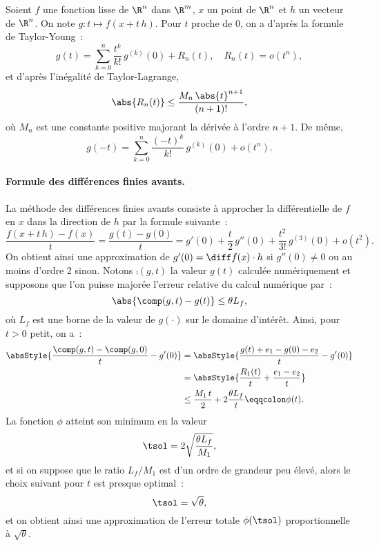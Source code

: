 Soient $f$ une fonction lisse de $\R^n$ dans $\R^m$, $x$ un point de $\R^n$ et $h$ un vecteur de $\R^n$. On note $g \colon t \mapsto f(x+t\,h)$.
Pour $t$ proche de $0$, on a d'apr\`es la formule de Taylor-Young~:
\begin{equation*}
    g(t) = \sum_{k=0}^n \frac{t^k}{k!}\, g^{(k)}(0) + R_n(t), \quad R_n(t) = o(t^n),
\end{equation*}
et d'apr\`es l'in\'egalit\'e de Taylor-Lagrange,
\begin{equation*}
    \abs{R_n(t)} \le \frac{M_n\, \abs{t}^{n+1}}{(n+1)!},
\end{equation*}
o\`u $M_n$ est une constante positive majorant la d\'eriv\'ee \`a l'ordre $n+1$.
De m\^eme,
\begin{equation*}
    g(-t) = \sum_{k=0}^n \frac{(-t)^k}{k!}\, g^{(k)}(0) + o(t^n).
\end{equation*}

\paragraph*{Formule des diff\'erences finies avants.} La m\'ethode des diff\'erences finies avants consiste \`a approcher la diff\'erentielle de 
$f$ en $x$ dans la direction de $h$ par la formule suivante~:
\begin{equation}
    \frac{f(x+t\,h)-f(x)}{t} = \frac{g(t)-g(0)}{t} = g'(0) + \frac{t}{2}\, g''(0) + \frac{t^2}{3!}\, g^{(3)}(0) + o(t^2).
    \label{eq:diffFinieAvant}
\end{equation}
On obtient ainsi une approximation de $g'(0) = \diff f(x) \cdot h$  si $g''(0) \ne 0$ ou au moins d'ordre 2 sinon.
%
Notons $\comp(g,t)$ la valeur $g(t)$ calcul\'ee num\'eriquement et supposons que l'on puisse major\'ee l'erreur relative du calcul num\'erique par~:
\[
    \abs{\comp(g,t) - g(t)} \le \theta L_f,
\]
o\`u $L_f$ est une borne de la valeur de $g(\cdot)$ sur le domaine d'int\'er\^et. Ainsi, pour $t>0$ petit, on a~:
\begin{equation*}
    \begin{aligned}
        \absStyle{\frac{\comp(g,t) - \comp(g,0)}{t} - g'(0)}  & = \absStyle{\frac{g(t) + e_1 - g(0) - e_2}{t} - g'(0)} \\
        & = \absStyle{\frac{R_1(t)}{t} + \frac{e_1-e_2}{t}} \\
        & \le \frac{M_1\, t}{2} + 2 \frac{\theta L_f}{t} \eqqcolon \phi(t).
    \end{aligned}
\end{equation*}
La fonction $\phi$ atteint son minimum en la valeur
\[
    \tsol = 2 \sqrt{\frac{\theta L_f}{M_1}},
\]
et si on suppose que le ratio $L_f / M_1$ est d'un ordre de grandeur peu \'elev\'e, alors le choix suivant pour $t$ est presque optimal~:
\[
    \tsol = \sqrt{\theta },
\]
et on obtient ainsi une approximation de l'erreur totale $\phi(\tsol)$ proportionnelle \`a $\sqrt{\theta}$.

